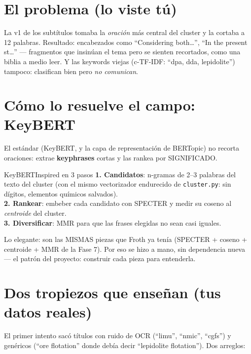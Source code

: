 \documentclass[11pt,a4paper]{article}
\begin{document}

\section{El problema (lo viste tú)}

La v1 de los subtítulos tomaba la \emph{oración} más central del cluster y la cortaba a
12 palabras. Resultado: encabezados como ``Considering both\ldots'', ``In the present
st\ldots'' --- fragmentos que insinúan el tema pero se sienten recortados, como una
biblia a medio leer. Y las keywords viejas (c-TF-IDF: ``dpa, dda, lepidolite'') tampoco:
clasifican bien pero \emph{no comunican}.

\section{Cómo lo resuelve el campo: KeyBERT}

El estándar (KeyBERT, y la capa de representación de BERTopic) no recorta oraciones:
extrae \textbf{keyphrases} cortas y las rankea por SIGNIFICADO.

\begin{concepto}{KeyBERTInspired en 3 pasos}
\textbf{1. Candidatos}: n-gramas de 2--3 palabras del texto del cluster (con el mismo
vectorizador endurecido de \texttt{cluster.py}: sin dígitos, elementos químicos
salvados). \\
\textbf{2. Rankear}: embeber cada candidato con SPECTER y medir su coseno al
\emph{centroide} del cluster. \\
\textbf{3. Diversificar}: MMR para que las frases elegidas no sean casi iguales.
\end{concepto}

Lo elegante: son las MISMAS piezas que Froth ya tenía (SPECTER + coseno + centroide +
MMR de la Fase 7). Por eso se hizo a mano, sin dependencia nueva --- el patrón del
proyecto: construir cada pieza para entenderla.

\section{Dos tropiezos que enseñan (tus datos reales)}

El primer intento sacó títulos con ruido de OCR (``limu'', ``nmic'', ``cgfs'') y
genéricos (``ore flotation'' donde debía decir ``lepidolite flotation''). Dos arreglos:
\end{document}
